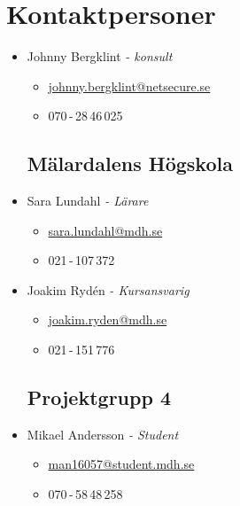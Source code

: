 \newpage
\section*{Kontaktpersoner}

\begin{itemize}
    \setlength\itemsep{0em}
    \subsection*{Netsecure Sweden AB}
        \item Johnny Bergklint \textit{- konsult}
            \begin{itemize}
                \item \href{mailto:johnny.bergklint@netsecure.se}{johnny.bergklint@netsecure.se}
                \item 070\,-\,28\,46\,025
            \end{itemize}

    \subsection*{Mälardalens Högskola}
        \item Sara Lundahl \textit{- Lärare}
            \begin{itemize}
                \item \href{mailto:sara.lundahl@mdh.se}{sara.lundahl@mdh.se}
                \item 021\,-\,107\,372
            \end{itemize}

        \item Joakim Rydén \textit{- Kursansvarig}
            \begin{itemize}
                \item \href{mailto:joakim.ryden@mdh.se}{joakim.ryden@mdh.se}
                \item 021\,-\,151\,776
            \end{itemize}

    \subsection*{Projektgrupp 4}
        \item Mikael Andersson \textit{- Student}
            \begin{itemize}
                \item \href{mailto:man16057@student.mdh.se}{man16057@student.mdh.se}
                \item 070\,-\,58\,48\,258
            \end{itemize}


\end{itemize}
